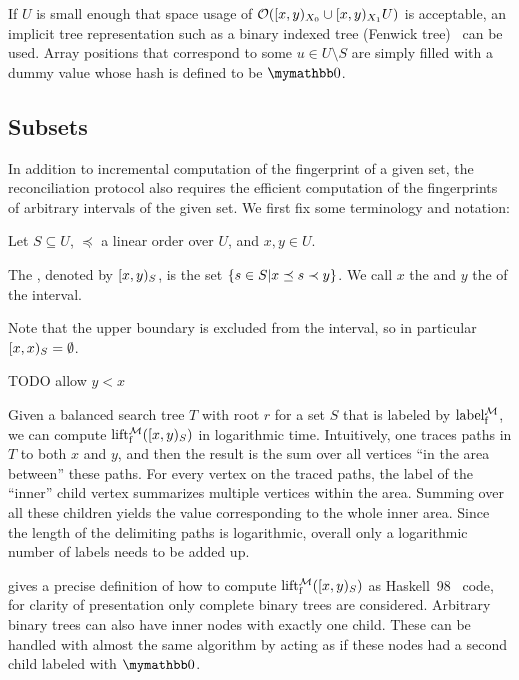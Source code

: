 If $U$ is small enough that space usage of $\mathcal{O}([{x},{y})_{X_0} \cup [{x},{y})_{X_1}{U})$ is acceptable, an implicit tree representation such as a binary indexed tree (Fenwick tree)~\cite{fenwick1994new} can be used. Array positions that correspond to some $u \in U \setminus S$ are simply filled with a dummy value whose hash is defined to be $\neutraladd$.

\subsection{Subsets}

In addition to incremental computation of the fingerprint of a given set, the reconciliation protocol also requires the efficient computation of the fingerprints of arbitrary intervals of the given set. We first fix some terminology and notation:

\begin{definition}
Let $S \subseteq U$, $\preceq$ a linear order over $U$, and $x, y \in U$.

The , denoted by $[{x},{y})_{S}$, is the set $\{s \in S | x \preceq s \prec y\}$. We call $x$ the  and $y$ the  of the interval.

Note that the upper boundary is excluded from the interval, so in particular $[{x},{x})_{S} = \emptyset$.

TODO allow $y < x$
\end{definition}

Given a balanced search tree $T$ with root $r$ for a set $S$ that is labeled by $\operatorname{label_{\operatorname{f}}^{\mathcal{M}}}$, we can compute $\operatorname{lift_{\operatorname{f}}^{\mathcal{M}}}([{x},{y})_{S})$ in logarithmic time. Intuitively, one traces paths in $T$ to both $x$ and $y$, and then the result is the sum over all vertices ``in the area between'' these paths. For every vertex on the traced paths, the label of the ``inner'' child vertex summarizes multiple vertices within the area. Summing over all these children yields the value corresponding to the whole inner area. Since the length of the delimiting paths is logarithmic, overall only a logarithmic number of labels needs to be added up.

 gives a precise definition of how to compute $\operatorname{lift_{\operatorname{f}}^{\mathcal{M}}}([{x},{y})_{S})$ as Haskell~98~\cite{jones2003haskell} code, for clarity of presentation only complete binary trees are considered. Arbitrary binary trees can also have inner nodes with exactly one child. These can be handled with almost the same algorithm by acting as if these nodes had a second child labeled with $\neutraladd$.

